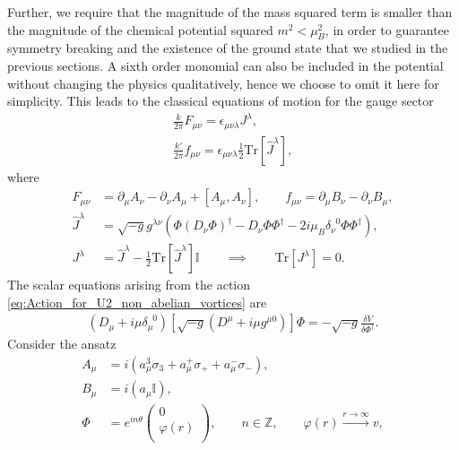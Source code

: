  Further, we require that the magnitude of the mass squared term is smaller than the magnitude of the chemical potential squared $m^2<\mu_B^2$, in order to guarantee symmetry breaking and the existence of the ground state that we studied in the previous sections. A sixth order monomial can also be included in the potential without changing the physics qualitatively, hence we choose to omit it here for simplicity. This leads to the classical equations of motion for the gauge sector
\begin{align}
    \frac{k}{2 \pi} F_{\mu \nu} = \epsilon_{\mu \nu \lambda} J^{\lambda},\\
    \frac{k'}{2\pi} f_{\mu \nu} = \epsilon_{\mu \nu \lambda} \frac{1}{2} \mathrm{Tr} \left[\hat{J}^{\lambda} \right],
\end{align}
where
\begin{align}
    F_{\mu \nu}&= \partial_{\mu} A_{\nu} - \partial_{\nu}A_{\mu} + [A_{\mu}, A_{\nu}], \qquad f_{\mu \nu} = \partial_{\mu} B_{\nu} - \partial_{\nu} B_{\mu}, \\
    \hat{J}^{\lambda} &= \sqrt{-g} g^{\lambda \nu} \left( \Phi \left( D_{\nu} \Phi\right)^{\dag} - D_{\nu} \Phi \Phi^{\dag}   -2i \mu_B \delta^{\;\; 0}_{\nu} \Phi \Phi^{\dag}  \right), \\
    J^{\lambda} &= \hat{J}^{\lambda} - \frac{1}{2}\mathrm{Tr}\left[\hat{J}^{\lambda} \right]\mathbb{I} \qquad \implies \qquad \mathrm{Tr}\left[J^{\lambda}\right]=0.
\end{align}
The scalar equations arising from the action \eqref{eq:Action_for_U2_non_abelian_vortices} are 
\begin{align}
    \left(D_{\mu} + i\mu \delta_{\mu}^{\;\; 0} \right) \left[\sqrt{-g} \left(D^{\mu}+i \mu g^{\mu 0}\right)\right] \Phi = - \sqrt{-g} \frac{\delta V}{\delta \Phi^{\dag}}. \label{eq:U2_scalar_EOM}
\end{align}
Consider the ansatz
\begin{align}
    A_{\mu} &= i \left(a_{\mu}^3 \sigma_3 + a_{\mu}^+ \sigma_{+} +a_{\mu}^{-} \sigma_{-} \right), \label{eq:U2_ansatz_non_abelian_gauge} \\
    B_{\mu} &= i \left( a_{\mu} \mathbb{I} \right), \label{eq:U2_ansatz_abelian_gauge}\\
    \Phi &=  e^{i n \theta} \begin{pmatrix}
        0\\
        \varphi(r)\\
    \end{pmatrix}, \qquad n\in \mathbb{Z}, \qquad \varphi(r) \xrightarrow{r \rightarrow \infty} v, \label{eq:U2_ansatz_scalar}
\end{align}
